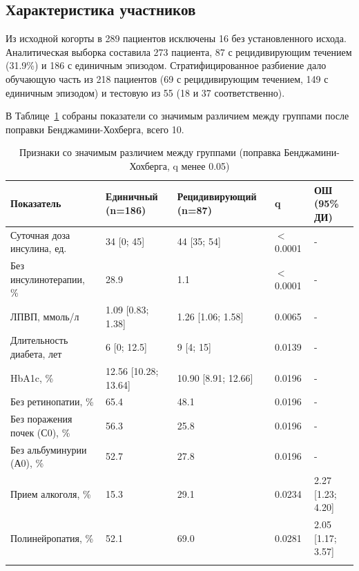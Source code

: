 \documentclass[pdflatex,sn-basic,Numbered]{sn-jnl}
\begin{document}
\subsection{Характеристика участников}\label{subsec3_1}

Из исходной когорты в 289 пациентов исключены 16 без установленного исхода. Аналитическая выборка составила 273 пациента, 87 с рецидивирующим течением (31.9\%) и 186 с единичным эпизодом. Стратифицированное разбиение дало обучающую часть из 218 пациентов (69 с рецидивирующим течением, 149 с единичным эпизодом) и тестовую из 55 (18 и 37 соответственно).

В Таблице~\ref{tab1} собраны показатели со значимым различием между группами после поправки Бенджамини-Хохберга, всего 10.

\begin{table}[h]
\caption{Признаки со значимым различием между группами (поправка Бенджамини-Хохберга, q менее 0.05)}\label{tab1}%
\begin{tabular}{@{}lllll@{}}
\toprule
Показатель & Единичный (n=186) & Рецидивирующий (n=87) & q & ОШ (95\% ДИ)\\
\midrule
Суточная доза инсулина, ед. & 34 [0; 45] & 44 [35; 54] & $<$0.0001 & -\\
Без инсулинотерапии, \% & 28.9 & 1.1 & $<$0.0001 & -\\
ЛПВП, ммоль/л & 1.09 [0.83; 1.38] & 1.26 [1.06; 1.58] & 0.0065 & -\\
Длительность диабета, лет & 6 [0; 12.5] & 9 [4; 15] & 0.0139 & -\\
HbA1c, \% & 12.56 [10.28; 13.64] & 10.90 [8.91; 12.66] & 0.0196 & -\\
Без ретинопатии, \% & 65.4 & 48.1 & 0.0196 & -\\
Без поражения почек (С0), \% & 56.3 & 25.8 & 0.0196 & -\\
Без альбуминурии (А0), \% & 52.7 & 27.8 & 0.0196 & -\\
Прием алкоголя, \% & 15.3 & 29.1 & 0.0234 & 2.27 [1.23; 4.20]\\
Полинейропатия, \% & 52.1 & 69.0 & 0.0281 & 2.05 [1.17; 3.57]\\
\botrule
\end{tabular}
\end{table}
\end{document}
